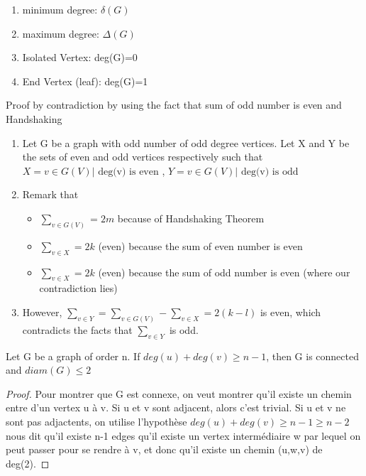 \documentclass{article}
\begin{document}
\begin{definition}
    \begin{enumerate}
	\item minimum degree: $\delta(G)$
	\item maximum degree: $\Delta(G)$
	\item Isolated Vertex: deg(G)=0
	\item End Vertex (leaf): deg(G)=1
    \end{enumerate}
\end{definition}

\begin{theorem}
    Proof by contradiction by using the fact that sum of odd number is even
    and Handshaking
    \begin{enumerate}
	\item Let G be a graph with odd number of odd degree vertices.
	    Let X and Y be the sets of even and odd vertices respectively
	    such that $ X={v \in G(V)| \text{ deg(v) is even }} $,
	    $ Y={v \in G(V)| \text{ deg(v) is odd}} $
	\item Remark that
	    \begin{itemize}
		\item $ \sum^{}_{v \in G(V)} = 2m$ because of Handshaking Theorem
	    \item $\sum^{}_{v \in X}  = 2k$ (even) because the sum of even
		number is even
	    \item $\sum^{}_{v \in X}  = 2k$ (even) because the sum of odd
		number is even (where our contradiction lies)
	    \end{itemize}
	\item However, $ \sum^{}_{v \in Y} = \sum^{}_{v \in G(V)} -
	\sum^{}_{v \in X} = 2(k-l) $ is even, which contradicts the facts that
	    $\sum^{}_{v \in Y}$ is odd.
    \end{enumerate}
\end{theorem}

\begin{theorem}
    Let G be a graph of order n. If $deg(u)+deg(v) \geq n-1$, then G is
    connected and $diam(G) \leq 2$
\end{theorem}

\begin{proof}
    Pour montrer que G est connexe, on veut montrer qu'il existe un
    chemin entre d'un vertex u à v. Si u et v sont adjacent, alors c'est
    trivial. Si u et v ne sont pas adjactents, on utilise l'hypothèse
    $deg(u)+deg(v) \geq n-1 \geq n-2$ nous dit qu'il existe n-1 edges qu'il
    existe un vertex intermédiaire w par lequel on peut passer pour se
    rendre à v, et donc qu'il existe un chemin (u,w,v) de deg(2).
\end{proof}
\end{document}
